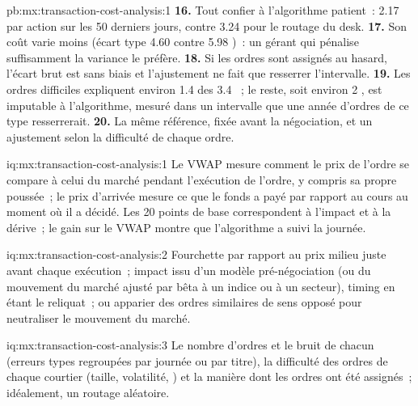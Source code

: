\begin{solution}{pb:mx:transaction-cost-analysis:1}
\textbf{16.} Tout confier à l'algorithme patient~: 2.17  par action sur les 50 derniers jours, contre 3.24 pour le routage du desk.
\textbf{17.} Son coût varie moins (écart type 4.60 contre 5.98 )~: un gérant qui pénalise suffisamment la variance le préfère.
\textbf{18.} Si les ordres sont assignés au hasard, l'écart brut est sans biais et l'ajustement ne fait que resserrer l'intervalle.
\textbf{19.} Les ordres difficiles expliquent environ 1.4 des 3.4 ~; le reste, soit environ 2 , est imputable à l'algorithme, mesuré dans un intervalle que
une année d'ordres de ce type resserrerait.
\textbf{20.} La même référence, fixée avant la négociation, et un ajustement selon la difficulté de chaque ordre.
\end{solution}

\begin{solution}{iq:mx:transaction-cost-analysis:1}
Le VWAP mesure comment le prix de l'ordre se compare à celui du marché pendant l'exécution de l'ordre, y compris sa propre poussée~; le prix d'arrivée mesure ce que le fonds a payé
par rapport au cours au moment où il a décidé. Les 20 points de base correspondent à l'impact et à la dérive~; le gain sur le VWAP montre que l'algorithme a suivi la journée.
\end{solution}

\begin{solution}{iq:mx:transaction-cost-analysis:2}
Fourchette par rapport au prix milieu juste avant chaque exécution~; impact issu d'un modèle pré-négociation (ou du mouvement du marché ajusté par bêta à un indice ou à un secteur), timing en étant le
reliquat~; ou apparier des ordres similaires de sens opposé pour neutraliser le mouvement du marché.
\end{solution}

\begin{solution}{iq:mx:transaction-cost-analysis:3}
Le nombre d'ordres et le bruit de chacun (erreurs types regroupées par journée ou par titre), la difficulté des ordres de chaque courtier (taille, volatilité,
) et la manière dont les ordres ont été assignés~; idéalement, un routage aléatoire.
\end{solution}

